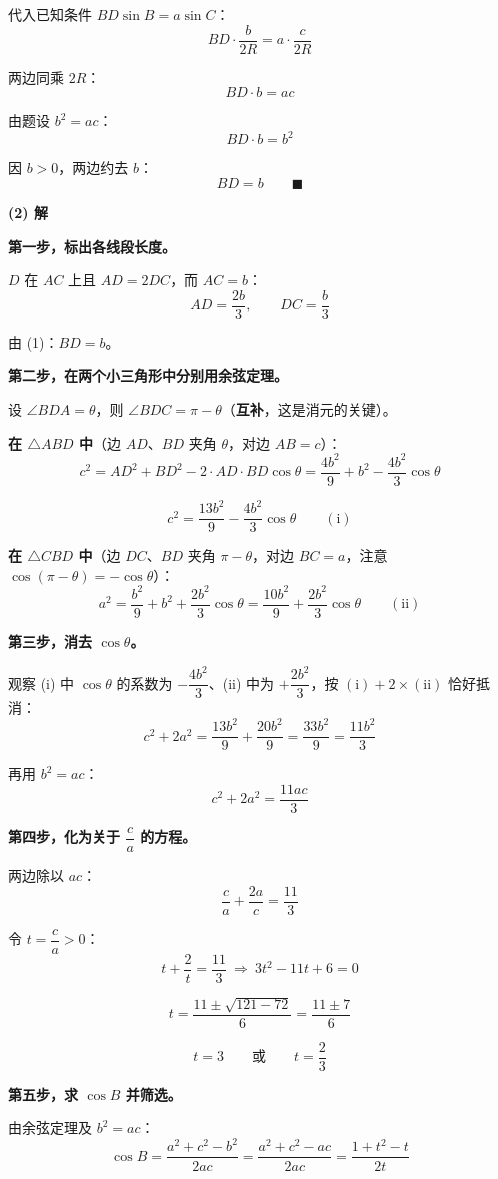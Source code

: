 代入已知条件 $BD\sin B=a\sin C$：
\[BD\cdot\frac b{2R}=a\cdot\frac c{2R}\]

两边同乘 $2R$：
\[BD\cdot b=ac\]

由题设 $b^{2}=ac$：
\[BD\cdot b=b^{2}\]

因 $b>0$，两边约去 $b$：
\[BD=b\qquad\blacksquare\]

\par\medskip

\textbf{(2) 解}

\textbf{第一步，标出各线段长度。}

$D$ 在 $AC$ 上且 $AD=2DC$，而 $AC=b$：
\[AD=\frac{2b}3,\qquad DC=\frac b3\]

由 (1)：$BD=b$。

\textbf{第二步，在两个小三角形中分别用余弦定理。}

设 $\angle BDA=\theta$，则 $\angle BDC=\pi-\theta$（\textbf{互补}，这是消元的关键）。

\textbf{在 $\triangle ABD$ 中}（边 $AD$、$BD$ 夹角 $\theta$，对边 $AB=c$）：
\[c^{2}=AD^{2}+BD^{2}-2\cdot AD\cdot BD\cos\theta=\frac{4b^{2}}9+b^{2}-\frac{4b^{2}}3\cos\theta\]

\[c^{2}=\frac{13b^{2}}9-\frac{4b^{2}}3\cos\theta\qquad(\text{i})\]

\textbf{在 $\triangle CBD$ 中}（边 $DC$、$BD$ 夹角 $\pi-\theta$，对边 $BC=a$，注意 $\cos(\pi-\theta)=-\cos\theta$）：
\[a^{2}=\frac{b^{2}}9+b^{2}+\frac{2b^{2}}3\cos\theta=\frac{10b^{2}}9+\frac{2b^{2}}3\cos\theta\qquad(\text{ii})\]

\textbf{第三步，消去 $\cos\theta$。}

观察 (i) 中 $\cos\theta$ 的系数为 $-\dfrac{4b^{2}}3$、(ii) 中为 $+\dfrac{2b^{2}}3$，按 $(\text{i})+2\times(\text{ii})$ 恰好抵消：
\[c^{2}+2a^{2}=\frac{13b^{2}}9+\frac{20b^{2}}9=\frac{33b^{2}}9=\frac{11b^{2}}3\]

再用 $b^{2}=ac$：
\[c^{2}+2a^{2}=\frac{11ac}3\]

\textbf{第四步，化为关于 $\dfrac ca$ 的方程。}

两边除以 $ac$：
\[\frac ca+\frac{2a}c=\frac{11}3\]

令 $t=\dfrac ca>0$：
\[t+\frac2t=\frac{11}3\ \Longrightarrow\ 3t^{2}-11t+6=0\]

\[t=\frac{11\pm\sqrt{121-72}}6=\frac{11\pm7}6\]

\[t=3\qquad\text{或}\qquad t=\frac23\]

\textbf{第五步，求 $\cos B$ 并筛选。}

由余弦定理及 $b^{2}=ac$：
\[\cos B=\frac{a^{2}+c^{2}-b^{2}}{2ac}=\frac{a^{2}+c^{2}-ac}{2ac}=\frac{1+t^{2}-t}{2t}\]

